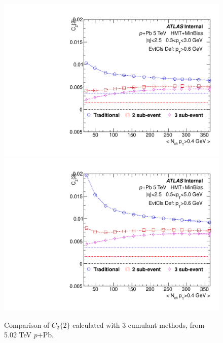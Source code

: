 \begin{figure}[p]
\includegraphics[width=0.4\linewidth]{figs/sec_result/pPb5/phy_2PC_Har0_Pt0_Cls3.pdf}
\includegraphics[width=0.4\linewidth]{figs/sec_result/pPb5/phy_2PC_Har0_Pt1_Cls3.pdf}
\caption{Comparison of $C_{2}\{2\}$ calculated with 3 cumulant methods, from 5.02 TeV $p$+Pb.}
\label{fig:result_pPb5_C22}
\end{figure}
\clearpage

